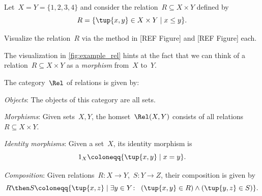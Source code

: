 \begin{exercise}
Let~$X = Y = \{1, 2, 3, 4 \}$ and consider the relation~$R \subseteq X \times Y$ defined by 
\begin{equation}
R = \{ \tup{x,y} \in X \times Y \mid x \leq y \}. 
\end{equation}

Visualize the relation~$R$ via the method in [REF Figure] and [REF Figure] each. 
\end{exercise}

The visualization in \cref{fig:example_rel} hints at the fact that we can think of a relation~$R \subseteq X \times Y$ as a \emph{morphism} from~$X$ to~$Y$.

\begin{definition} 
    The category~$\Rel$ of relations is given by:
    \begin{compactenum}
    \item \emph{Objects}: The objects of this category are all sets.
    \item \emph{Morphisms}: Given sets~$X, Y$, the homset~$\Rel(X,Y)$ consists of all
    relations~$R\subseteq X\times Y$.
    \item \emph{Identity morphisms}: Given a set~$X$, its identity morphism is
  	\begin{equation}
	1_X \coloneqq \{ \tup{x,y} \mid  x = y \}.
	\end{equation}
    \item \emph{Composition}: Given relations~$R \colon X\to Y$,~$S\colon Y\to Z$, their composition is given by
    \begin{equation}\label{RelCompRule}
    R \then S \coloneqq \{\tup{x,z} \mid  \exists y \in Y \colon \ \left(\tup{x,y} \in R\right) \wedge \left(\tup{y,z} \in S\right)\}.
    \end{equation}
\end{compactenum}
\end{definition}


